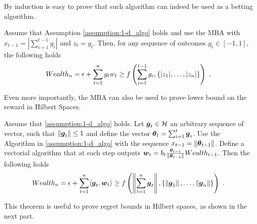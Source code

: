 By induction is easy to prove that such algorithm can indeed be used as a betting algorithm. 
\begin{theorem}
\label{theo:1-d_reward}
Assume that Assumption \ref{assumption:1-d_algo} holds and use the \ac{MBA} with $x_{t-1}=|\sum_{i=1}^{t-1} g_i|$ and $z_t=g_t$.
Then, for any sequence of outcomes $g_t \in [-1,1]$, the following holds
\[
Wealth_n = \epsilon+\sum_{t=1}^n g_t w_t \geq f\left( \sum_{i=1}^{t-1} g_i , \left\{|z_1|, \ldots, |z_n|\right\}\right)~.
\]
\end{theorem}

Even more importantly, the \ac{MBA} can also be used to prove lower bound on the reward in Hilbert Spaces.
\begin{theorem}
\label{theo:hilbert_reward}
  Assume that \ref{assumption:1-d_algo} holds.
  Let $\boldsymbol{g}_t \in \mathcal{H}$ an arbitrary sequence of vector, such that $\left\|{\boldsymbol{g}_t}\right\| \leq 1$ and define the vector ${\boldsymbol{\theta}}_t=\sum_{i=1}^{t} \boldsymbol{g}_i$.
  Use the Algorithm in \ref{assumption:1-d_algo} with the sequence $x_{t-1}= \left\|{{\boldsymbol{\theta}}_{t-1}}\right\|$.
  Define a vectorial algorithm that at each step outputs $\boldsymbol{w}_t = b_t \frac{{\boldsymbol{\theta}}_{t-1}}{\left\|{{\boldsymbol{\theta}}_{t-1}}\right\|} Wealth_{t-1}$. Then the following holds
  \[
  Wealth_{n} = \epsilon + \sum_{t=1}^n \langle \boldsymbol{g}_t, \boldsymbol{w}_t \rangle \geq f\left( \left\|{\sum_{t=1}^n \boldsymbol{g}_t}\right\|, \left\{\left\|{\boldsymbol{g}_1}\right\|, \ldots, \left\|{\boldsymbol{g}_n}\right\|\right\}\right)~.
  \]
\end{theorem}
This theorem is useful to prove regret bounds in Hilbert spaces, as shown in the next part.

